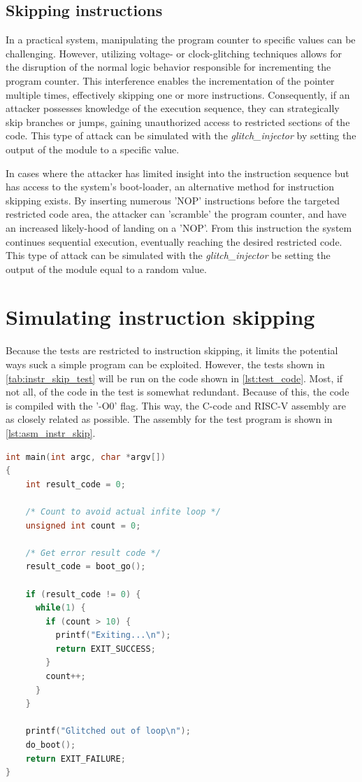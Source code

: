 \subsection{Skipping instructions}
\label{subsec:skip_instr}

In a practical system, manipulating the program counter to specific values can be challenging. However, utilizing voltage- or clock-glitching techniques allows for the disruption of the normal logic behavior responsible for incrementing the program counter. This interference enables the incrementation of the pointer multiple times, effectively skipping one or more instructions. Consequently, if an attacker possesses knowledge of the execution sequence, they can strategically skip branches or jumps, gaining unauthorized access to restricted sections of the code. This type of attack can be simulated with the \textit{glitch\_injector} by setting the output of the module to a specific value. 

In cases where the attacker has limited insight into the instruction sequence but has access to the system's boot-loader, an alternative method for instruction skipping exists. By inserting numerous 'NOP' instructions before the targeted restricted code area, the attacker can 'scramble' the program counter, and have an increased likely-hood of landing on a 'NOP'. From this instruction the system continues sequential execution, eventually reaching the desired restricted code. This type of attack can be simulated with the \textit{glitch\_injector} be setting the output of the module equal to a random value. 

\section{Simulating instruction skipping}
\label{sec:sim_instr_skip}

Because the tests are restricted to instruction skipping, it limits the potential ways suck a simple program can be exploited. However, the tests shown in \autoref{tab:instr_skip_test} will be run on the code shown in \autoref{lst:test_code}. Most, if not all, of the code in the test is somewhat redundant. Because of this, the code is compiled with the '-O0' flag. This way, the C-code and RISC-V assembly are as closely related as possible. The assembly for the test program is shown in \autoref{lst:asm_instr_skip}. 

\begin{lstlisting}[caption={A sample C++ code}, label=lst:test_code, language=C++]
int main(int argc, char *argv[])
{
    int result_code = 0;

    /* Count to avoid actual infite loop */
    unsigned int count = 0;

    /* Get error result code */
    result_code = boot_go();

    if (result_code != 0) {
      while(1) {
       	if (count > 10)	{
          printf("Exiting...\n");
       	  return EXIT_SUCCESS;
        }
        count++;
      }
    }

    printf("Glitched out of loop\n");
    do_boot();
    return EXIT_FAILURE;
}
\end{lstlisting}

